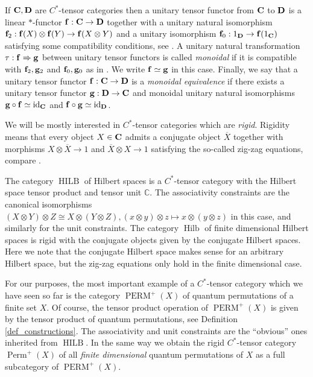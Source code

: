 \documentclass[a4paper]{amsart}
\newcommand*{\Bf}{{\bf f}}
\newcommand*{\Bg}{{\bf g}}
\newcommand*{\BC}{{\bf C}}
\newcommand*{\BD}{{\bf D}}
\DeclareMathOperator{\id}{id}
\DeclareMathOperator{\Hilb}{Hilb}
\DeclareMathOperator{\HILB}{HILB}
\DeclareMathOperator{\Perm}{Perm}
\DeclareMathOperator{\PERM}{PERM}
\numberwithin{equation}{section}
\theoremstyle{change}
\begin{document}
If $ \BC, \BD $ are $ C^* $-tensor categories then a unitary tensor functor from $ \BC $ to $ \BD $ is a linear $ * $-functor $ \Bf: \BC \rightarrow \BD $ together with a unitary natural isomorphism $ \Bf_2: \Bf(X) \otimes \Bf(Y) \rightarrow \Bf(X \otimes Y) $ and a unitary 
isomorphism $ \Bf_0: 1_\BD \rightarrow \Bf(1_\BC) $ satisfying some compatibility conditions, 
see \cite[Definition 2.1.3]{NESHVEYEV_TUSET_compactquantumgroups}. 
A unitary natural transformation $ \tau: \Bf \Rightarrow \Bg $ 
between unitary tensor functors is called \emph{monoidal} if it is compatible 
with $ \Bf_2, \Bg_2 $ and $ \Bf_0, \Bg_0 $ as in \cite[Definition 2.1.5]{NESHVEYEV_TUSET_compactquantumgroups}. We write $ \Bf \simeq \Bg $ in this case. Finally, we say that a unitary tensor functor $ \Bf: \BC \rightarrow \BD $ is a \emph{monoidal equivalence} if there exists a unitary tensor functor $ \Bg: \BD \rightarrow \BC $ and monoidal unitary natural isomorphisms $ \Bg \circ \Bf \simeq \id_\BC$ and $ \Bf \circ \Bg \simeq \id_\BD $. 

We will be mostly interested in $ C^* $-tensor categories which are \emph{rigid}. Rigidity means that every object $ X \in \BC $ admits a conjugate object $ \overline{X} $ together with morphisms $ X \otimes \overline{X} \rightarrow 1 $ and $ \overline{X} \otimes X \rightarrow 1 $ satisfying the so-called zig-zag equations, compare 
\cite[Definition 2.2.1]{NESHVEYEV_TUSET_compactquantumgroups}.

The category $ \HILB $ of Hilbert spaces is a $ C^* $-tensor category with the Hilbert space tensor product and tensor unit $ \mathbb{C} $. 
The associativity constraints are the canonical isomorphisms $ (X \otimes Y) \otimes Z \cong X \otimes (Y \otimes Z), (x \otimes y) \otimes z \mapsto x \otimes (y \otimes z) $ 
in this case, and similarly for the unit constraints. The category $ \Hilb $ of finite dimensional Hilbert spaces is rigid with 
the conjugate objects given by the conjugate Hilbert spaces. Here we note that the conjugate Hilbert space makes sense for an arbitrary Hilbert space, but the zig-zag equations only hold in the finite dimensional case. 

For our purposes, the most important example of a $ C^* $-tensor category which we have seen so far is the category $ \PERM^+(X) $ of quantum permutations of a finite set $ X $. Of course, the tensor product operation of $ \PERM^+(X) $ is given by the tensor product of quantum permutations, see Definition \ref{def_constructions}. The associativity and unit constraints are the ``obvious'' ones inherited from $ \HILB $. In the same way we obtain the rigid $ C^* $-tensor category $ \Perm^+(X) $ of all \emph{finite dimensional} quantum permutations of $ X $ as a full subcategory of $ \PERM^+(X) $.
\end{document}
